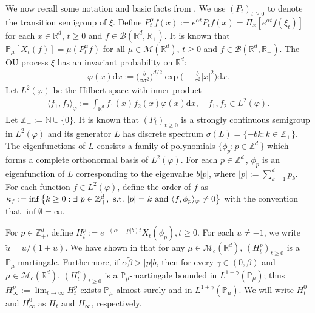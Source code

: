 \documentclass[12pt,a4paper]{amsart}
\theoremstyle{plain}
\theoremstyle{definition}
\numberwithin{equation}{section}
\begin{document}
	We now recall some notation and basic facts from \cite{RenSongSunZhao2019Stable}.
	We use  $(P_t)_{t\geq 0}$ to denote the transition semigroup of $\xi$.	
	Define $P^{\alpha}_t f(x) := e^{\alpha t} P_t f(x) = \Pi_x [e^{\alpha t}f(\xi_t)]$ for each $x\in \mathbb R^d$, $t\geq 0$ and $f\in \mathcal B(\mathbb R^d, \mathbb R_+)$.
	It is known that $\mathbb{P}_{\mu}[X_t (f)]  = \mu( P^\alpha_t f)$ for all $\mu\in \mathcal M(\mathbb R^d)$, $t\geq 0$ and $f\in \mathcal B(\mathbb R^d, \mathbb R_+)$.
	The OU process $\xi$ has an invariant probability on $\mathbb R^d$:
\begin{align}
  	\varphi(x)\mathrm dx
  	:=\Big (\frac{b}{\pi \sigma^2}\Big )^{d/2}\exp \Big(-\frac{b}{\sigma^2}|x|^2 \Big)\mathrm dx.
\end{align}
	Let $L^2(\varphi)$ be the Hilbert space with inner product
\begin{align}
  	\langle f_1, f_2 \rangle_{\varphi}
  	:= \int_{\mathbb R^d}f_1(x)f_2(x)\varphi(x) \mathrm dx, \quad f_1,f_2 \in L^2(\varphi).
\end{align}
	Let $\mathbb Z_+ := \mathbb N\cup\{0\}$.
	It is known that $(P_t)_{t\geq 0}$ is a strongly continuous semigroup in $L^2(\varphi)$ and its generator $L$ has discrete spectrum $\sigma(L)= \{-bk: k \in \mathbb Z_+\}$.	
		The eigenfunctions of $L$ consists a family of polynomials $\{\phi_p:p\in \mathbb Z_+^d\}$ which forms a complete orthonormal basis of $L^2(\varphi)$.
For each $p\in \mathbb Z_+^d$, 
$\phi_p$ is an eigenfunction of $L$ corresponding to the eigenvalue $b|p|$, where $|p|:= \sum_{k=1}^d p_k$.
	For each function $f\in L^2(\varphi)$, define the order of $f$ as
$\kappa_f
  	:= \inf \left \{k\geq 0: \exists ~ p\in \mathbb Z_+^d , {\rm ~s.t.~} |p|=k {\rm ~and~}  \langle f, \phi_p \rangle_{\varphi}\neq 0\right \}$
with the convention that $\inf\emptyset=\infty.$
	
	For $p\in \mathbb{Z}_+^d$, define
$H_t^p
    	:= e^{-(\alpha-|p|b)t}X_t(\phi_p), t\geq 0.$
	For each $u \neq -1$, we write $\tilde u = u/(1+ u)$.
	We have shown in \cite[Lemma 3.2]{RenSongSunZhao2019Stable} that
	for any
	$\mu\in \mathcal M_c(\mathbb R^d)$, $(H_t^p)_{t\geq 0}$ is a $\mathbb{P}_{\mu}$-martingale.
	Furthermore, if $\alpha \tilde \beta>|p|b$, then for every $\gamma\in (0, \beta)$ and $\mu\in \mathcal M_c(\mathbb R^d)$,  $(H_t^p)_{t\geq 0}$ is a $\mathbb{P}_{\mu}$-martingale bounded in $L^{1+\gamma}(\mathbb{P}_{\mu})$;
	thus $H^p_{\infty}:=\lim_{t\rightarrow \infty}H_t^p$ exists $\mathbb{P}_{\mu}$-almost surely and in $L^{1+\gamma}(\mathbb P_\mu)$.
We will write $H^0_t$ and $H^0_\infty$ as $H_t$ and $H_\infty$, respectively.
\end{document}

